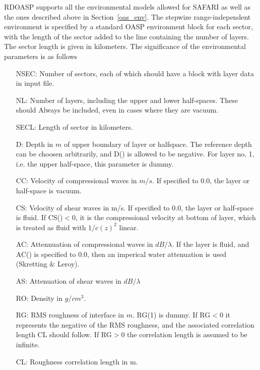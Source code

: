 RDOASP supports all the environmental models allowed for SAFARI as
well as the ones described above in Section~\ref{oas_env}.  The
stepwize range-independent environment is specified by a standard OASP
environment block for each sector, with the length of the sector added
to the line containing the number of layers. The sector length is
given in kilometers. The significance of the environmental parameters
is as follows
\begin{itemize}	
		\item[NSEC:] Number of sectors, each of which should
		have a block with layer data in input file.
		\item[NL:]	Number of layers, including the upper and lower
		half-spaces. These should Always be included,
		even in cases where they are vacuum.
		\item[SECL:] Length of sector in kilometers.

		\item[D:]	Depth in $m$ of upper boundary of layer or
		halfspace. The reference depth can be choosen
		arbitrarily, and D() is allowed to be negative.
		For layer no. 1, i.e. the upper half-space, this
     		parameter is dummy.

		\item[CC:]	Velocity of compressional waves in $m/s$.
        	If specified to 0.0, the layer or half-space is
		vacuum.

		\item[CS:]	Velocity of shear waves in m/s.
 		If specified to 0.0, the layer or half-space is fluid.
                If CS()$< 0$, it is the compressional velocity at bottom of
		layer, which is treated as fluid with $1/c(z)^{2}$ linear.

		\item[AC:]   Attennuation of compressional waves in 
		$dB/\lambda$. If the layer is fluid, and AC() is specified to
		0.0, then an imperical water attenuation is
		used (Skretting \& Leroy).

		\item[AS:]   Attenuation of shear waves in $dB/\lambda$

		\item[RO:]   Density in $g/cm^{3}$.

		\item[RG:]  RMS roughness of interface in $m$. RG(1) is dummy. If RG$<0$ it represents the negative of the RMS roughness, and the associated correlation length CL should follow. If RG$>0$ the correlation length is assumed to be infinite.
		\item[CL:] Roughness correlation length in m. 
		\end{itemize}


